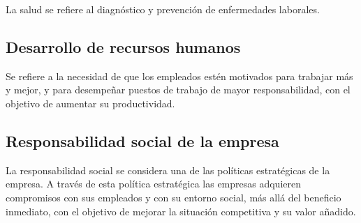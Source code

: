 \documentclass{article}
\begin{document}
	La salud se refiere al diagnóstico y prevención de enfermedades laborales.
	
	\subsection*{Desarrollo de recursos humanos}
	
	Se refiere a la necesidad de que los empleados estén motivados para trabajar más y mejor, y para desempeñar puestos de trabajo de mayor responsabilidad, con el objetivo de aumentar su productividad.
	
	\subsection*{Responsabilidad social de la empresa}
	
	La responsabilidad social se considera una de las políticas estratégicas de la empresa. A través de esta política estratégica las empresas adquieren compromisos con sus empleados y con su entorno social, más allá del beneficio inmediato, con el objetivo de mejorar la situación competitiva y su valor añadido.
	
\end{document}
